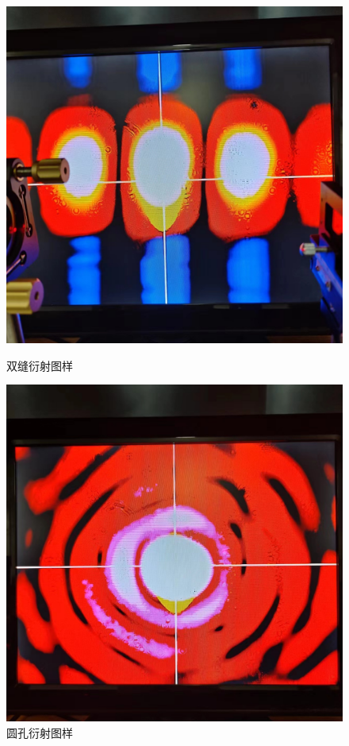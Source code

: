 \documentclass[12pt,a4paper,oneside]{ctexart}
\begin{document}
\begin{figure}[H]
    \begin{minipage}[t]{0.5\linewidth}
        \centering
        \includegraphics[scale=0.15]{sf.jpg}
        \caption{双缝衍射图样}
        \label{fig:side:a}
      \end{minipage}%
      \begin{minipage}[t]{0.5\linewidth}
        \centering
        \includegraphics[scale=0.15]{yk.jpg}
        \caption{圆孔衍射图样}
        \label{fig:side:b}
      \end{minipage}
     
\end{figure}
\end{document}
